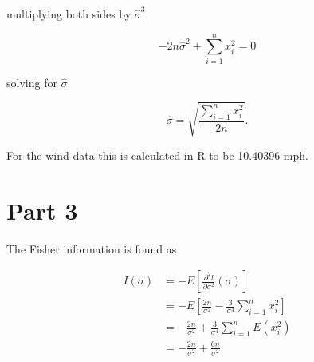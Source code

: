 \documentclass[11pt]{article}
\begin{document}
multiplying both sides by $ \hat{\sigma}^3 $

$$
-2n \hat\sigma^2 + \sum_{i=1}^n{x_i^2} = 0
$$

solving for $ \hat\sigma $

$$
\hat\sigma = \sqrt{\frac{\sum_{i=1}^n{x_i^2}}{2n}} \text{.}
$$


For the wind data this is calculated in R to be 10.40396 mph.

\section*{Part 3}

The Fisher information is found as

\begin{align*}
I(\sigma) &= - E\left[ \frac{\partial^2 l}{\partial \sigma^2}(\sigma)\right] \\
&= - E\left[ \frac{2n}{\sigma^2} - \frac{3}{\sigma^4} \sum_{i=1}^n {x_i^2} \right] \\
&= - \frac{2n}{\sigma^2} + \frac{3}{\sigma^4} \sum_{i=1}^n {E(x_i^2)} \\
&= - \frac{2n}{\sigma^2} + \frac{6n}{\sigma^2}
\end{align*}
\end{document}
